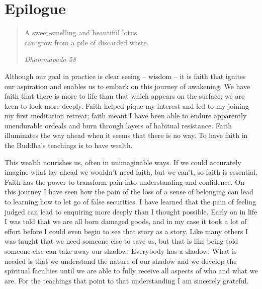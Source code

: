 \chapter{Epilogue}

\begin{quote}
A sweet-smelling and beautiful lotus\\
can grow from a pile of discarded waste.

\emph{Dhammapada 58}
\end{quote}

Although our goal in practice is clear seeing -- wisdom -- it is faith
that ignites our aspiration and enables us to embark on this journey of
awakening. We have faith that there is more to life than that which
appears on the surface; we are keen to look more deeply. Faith helped
pique my interest and led to my joining my first meditation retreat;
faith meant I have been able to endure apparently unendurable ordeals
and burn through layers of habitual resistance. Faith illuminates the
way ahead when it seems that there is no way. To have faith in the
Buddha's teachings is to have wealth.

This wealth nourishes us, often in unimaginable ways. If we could
accurately imagine what lay ahead we wouldn't need faith, but we can't,
so faith is essential. Faith has the power to transform pain into
understanding and confidence. On this journey I have seen how the pain
of the loss of a sense of belonging can lead to learning how to let go
of false securities. I have learned that the pain of feeling judged can
lead to enquiring more deeply than I thought possible. Early on in life
I was told that we are all born damaged goods, and in my case it took a
lot of effort before I could even begin to see that story as a story.
Like many others I was taught that we need someone else to save us, but
that is like being told someone else can take away our shadow. Everybody
has a shadow. What is needed is that we understand the nature of our
shadow and we develop the spiritual faculties until we are able to fully
receive all aspects of who and what we are. For the teachings that point
to that understanding I am sincerely grateful.

